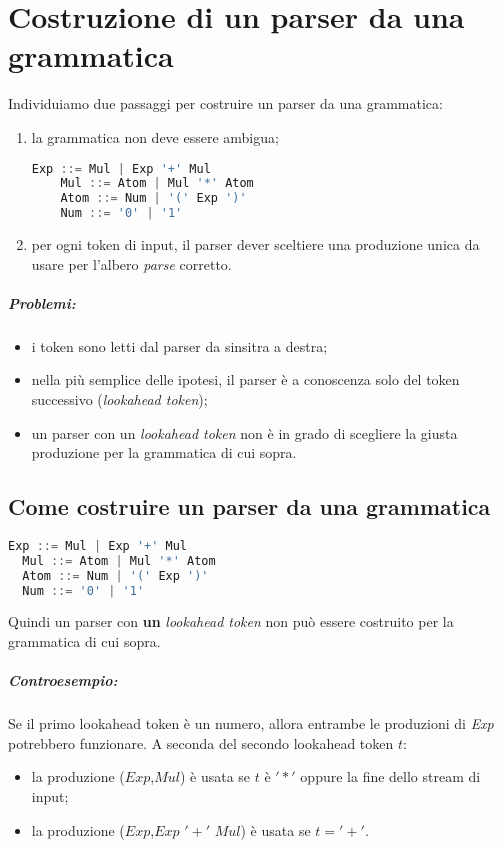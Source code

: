 \chapter{Costruzione di un parser da una grammatica}
Individuiamo due passaggi per costruire un parser da una grammatica:
\begin{enumerate}
  \item la grammatica non deve essere ambigua;
    \begin{lstlisting}[language=Java, caption={Una grammatica non ambigua}]
    Exp ::= Mul | Exp '+' Mul
    Mul ::= Atom | Mul '*' Atom
    Atom ::= Num | '(' Exp ')'
    Num ::= '0' | '1'
    \end{lstlisting}
  \item per ogni token di input, il parser dever sceltiere una
    produzione unica da usare per l'albero \emph{parse} corretto.
\end{enumerate}

\paragraph{Problemi:}
\begin{itemize}
  \item i token sono letti dal parser da sinsitra a destra;
  \item nella più semplice delle ipotesi, il parser è a conoscenza
    solo del token successivo (\emph{lookahead token});
  \item un parser con un \emph{lookahead token} non è in grado di
    scegliere la giusta produzione per la grammatica di cui sopra.
\end{itemize}

\section{Come costruire un parser da una grammatica}
\begin{lstlisting}[language=Java, caption={Una grammatica non ambigua}]
  Exp ::= Mul | Exp '+' Mul
  Mul ::= Atom | Mul '*' Atom
  Atom ::= Num | '(' Exp ')'
  Num ::= '0' | '1'
\end{lstlisting}
Quindi un parser con \textbf{un} \emph{lookahead token} non può essere
costruito per la grammatica di cui sopra.
\paragraph{Controesempio:}
Se il primo lookahead token è un numero, allora entrambe le produzioni di
\emph{Exp} potrebbero funzionare.
A seconda del secondo lookahead token $t$:
\begin{itemize}
  \item la produzione ($Exp$,$Mul$) è usata se $t$ è $'*'$ oppure la fine
    dello stream di input;
  \item la produzione ($Exp$,$Exp$ $'+'$ $Mul$) è usata se $t='+'$.
\end{itemize}

